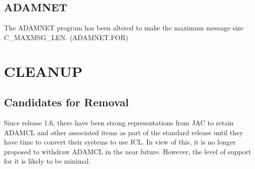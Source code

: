\subsection{ADAMNET}
The ADAMNET program has been altered to make the maximum message size
C\-\_MAXMSG\-\_LEN. (ADAMNET.FOR)

\section{CLEANUP}
\subsection{Candidates for Removal}
Since release 1.6, there have been strong representations from JAC to retain
ADAMCL and other associated items as part of the standard release until
they have time to convert their systems to use ICL.
In view of this, it is no longer proposed to withdraw ADAMCL in the near
future.
However, the level of support for it is likely to be minimal.


